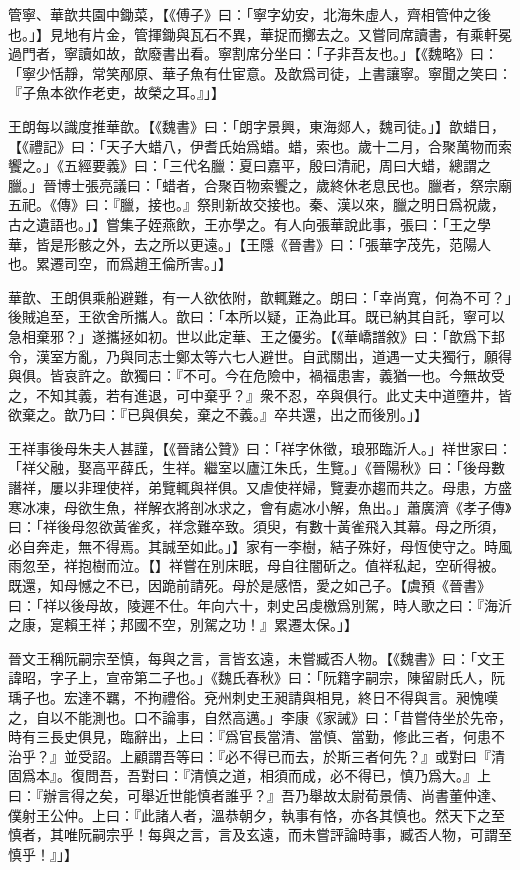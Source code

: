 管寧、華歆共園中鋤菜，【《傅子》曰：「寧字幼安，北海朱虛人，齊相管仲之後也。」】見地有片金，管揮鋤與瓦石不異，華捉而擲去之。又嘗同席讀書，有乘軒冕過門者，寧讀如故，歆廢書出看。寧割席分坐曰：「子非吾友也。」【《魏略》曰：「寧少恬靜，常笑邴原、華子魚有仕宦意。及歆爲司徒，上書讓寧。寧聞之笑曰：『子魚本欲作老吏，故榮之耳。』」】

王朗每以識度推華歆。【《魏書》曰：「朗字景興，東海郯人，魏司徒。」】歆蜡日，【《禮記》曰：「天子大蜡八，伊耆氏始爲蜡。蜡，索也。歲十二月，合聚萬物而索饗之。」《五經要義》曰：「三代名臘：夏曰嘉平，殷曰清祀，周曰大蜡，總謂之臘。」晉博士張亮議曰：「蜡者，合聚百物索饗之，歲終休老息民也。臘者，祭宗廟五祀。《傳》曰：『臘，接也。』祭則新故交接也。秦、漢以來，臘之明日爲祝歲，古之遺語也。」】嘗集子姪燕飲，王亦學之。有人向張華說此事，張曰：「王之學華，皆是形骸之外，去之所以更遠。」【王隱《晉書》曰：「張華字茂先，范陽人也。累遷司空，而爲趙王倫所害。」】

華歆、王朗俱乘船避難，有一人欲依附，歆輒難之。朗曰：「幸尚寬，何為不可？」後賊追至，王欲舍所攜人。歆曰：「本所以疑，正為此耳。既已納其自託，寧可以急相棄邪？」遂攜拯如初。世以此定華、王之優劣。【《華嶠譜敘》曰：「歆爲下邽令，漢室方亂，乃與同志士鄭太等六七人避世。自武關出，道遇⼀丈夫獨行，願得與俱。皆哀許之。歆獨曰：『不可。今在危險中，禍福患害，義猶⼀也。今無故受之，不知其義，若有進退，可中棄乎？』衆不忍，卒與俱行。此丈夫中道墮井，皆欲棄之。歆乃曰：『已與俱矣，棄之不義。』卒共還，出之而後別。」】

王祥事後母朱夫人甚謹，【《晉諸公贊》曰：「祥字休徵，琅邪臨沂人。」祥世家曰：「祥父融，娶高平薛氏，生祥。繼室以廬江朱氏，生覽。」《晉陽秋》曰：「後母數譖祥，屢以非理使祥，弟覽輒與祥俱。又虐使祥婦，覽妻亦趨而共之。母患，方盛寒冰凍，母欲生魚，祥解衣將剖冰求之，會有處冰小解，魚出。」蕭廣濟《孝子傳》曰：「祥後母忽欲黃雀炙，祥念難卒致。須臾，有數十黃雀飛入其幕。母之所須，必自奔走，無不得焉。其誠至如此。」】家有一李樹，結子殊好，母恆使守之。時風雨忽至，祥抱樹而泣。【】祥嘗在別床眠，母自往闇斫之。值祥私起，空斫得被。既還，知母憾之不已，因跪前請死。母於是感悟，愛之如己子。【虞預《晉書》曰：「祥以後母故，陵遲不仕。年向六十，刺史呂虔檄爲別駕，時人歌之曰：『海沂之康，寔賴王祥；邦國不空，別駕之功！』累遷太保。」】

晉文王稱阮嗣宗至慎，每與之言，言皆玄遠，未嘗臧否人物。【《魏書》曰：「文王諱昭，字子上，宣帝第⼆子也。」《魏氏春秋》曰：「阮籍字嗣宗，陳留尉氏人，阮瑀子也。宏達不羈，不拘禮俗。兗州刺史王昶請與相見，終日不得與言。昶愧嘆之，自以不能測也。口不論事，自然高邁。」李康《家誡》曰：「昔嘗侍坐於先帝，時有三長史俱見，臨辭出，上曰：『爲官長當清、當慎、當勤，修此三者，何患不治乎？』並受詔。上顧謂吾等曰：『必不得已而去，於斯三者何先？』或對曰『清固爲本』。復問吾，吾對曰：『清慎之道，相須而成，必不得已，慎乃爲大。』上曰：『辦言得之矣，可舉近世能慎者誰乎？』吾乃舉故太尉荀景倩、尚書董仲達、僕射王公仲。上曰：『此諸人者，溫恭朝夕，執事有恪，亦各其慎也。然天下之至慎者，其唯阮嗣宗乎！每與之言，言及玄遠，而未嘗評論時事，臧否人物，可謂至慎乎！』」】

